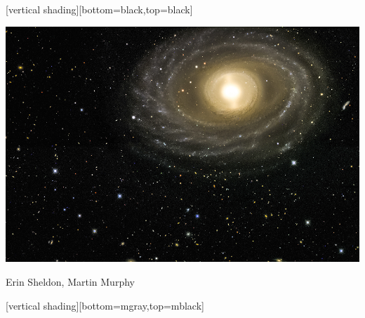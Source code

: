 \documentclass{beamer}
\begin{document}
{
    [vertical shading][bottom=black,top=black]
	
    \frame
    {

        \begin{center}
            \includegraphics[width=1.1\textwidth]{ngc_new_v0-1398_20130130-mm1-2-950px.jpg}

            {\tiny \hfill Erin Sheldon, Martin Murphy}
        \end{center}
    }

    [vertical shading][bottom=mgray,top=mblack]

}
\end{document}
